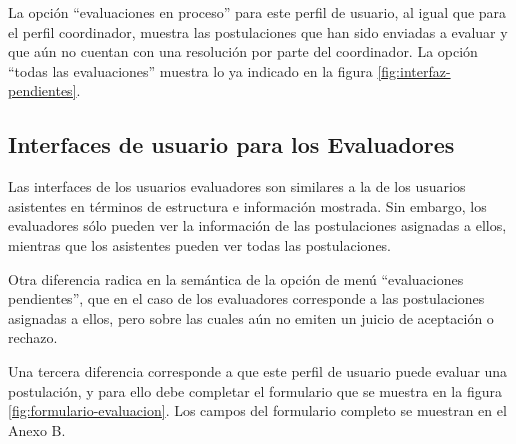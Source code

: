 La opción “evaluaciones en proceso” para este perfil de usuario, al igual que
para el perfil coordinador, muestra las postulaciones que han sido enviadas a
evaluar y que aún no cuentan con una resolución por parte del coordinador. La
opción “todas las evaluaciones” muestra lo ya indicado en la figura
\ref{fig:interfaz-pendientes}.

\subsection{Interfaces de usuario para los Evaluadores}

Las interfaces de los usuarios evaluadores son similares a la de los usuarios
asistentes en términos de estructura e información mostrada. Sin embargo, los
evaluadores sólo pueden ver la información de las postulaciones asignadas a
ellos, mientras que los asistentes pueden ver todas las postulaciones.

Otra diferencia radica en la semántica de la opción de menú “evaluaciones
pendientes”, que en el caso de los evaluadores corresponde a las postulaciones
asignadas a ellos, pero sobre las cuales aún no emiten un juicio de aceptación o
rechazo.

Una tercera diferencia corresponde a que este perfil de usuario puede evaluar
una postulación, y para ello debe completar el formulario que se muestra en la
figura \ref{fig:formulario-evaluacion}. Los campos del formulario completo se
muestran en el Anexo B.

